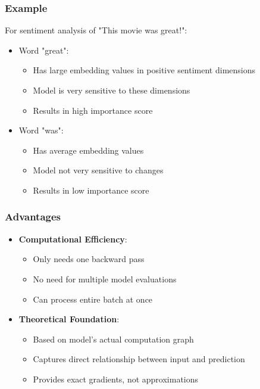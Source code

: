 \documentclass{article}
\begin{document}
\subsubsection{Example}
For sentiment analysis of "This movie was great!":
\begin{itemize}
    \item Word "great":
        \begin{itemize}
            \item Has large embedding values in positive sentiment dimensions
            \item Model is very sensitive to these dimensions
            \item Results in high importance score
        \end{itemize}
    \item Word "was":
        \begin{itemize}
            \item Has average embedding values
            \item Model not very sensitive to changes
            \item Results in low importance score
        \end{itemize}
\end{itemize}

\subsubsection{Advantages}
\begin{itemize}
    \item \textbf{Computational Efficiency}:
        \begin{itemize}
            \item Only needs one backward pass
            \item No need for multiple model evaluations
            \item Can process entire batch at once
        \end{itemize}
    \item \textbf{Theoretical Foundation}:
        \begin{itemize}
            \item Based on model's actual computation graph
            \item Captures direct relationship between input and prediction
            \item Provides exact gradients, not approximations
        \end{itemize}
\end{itemize}
\end{document}
